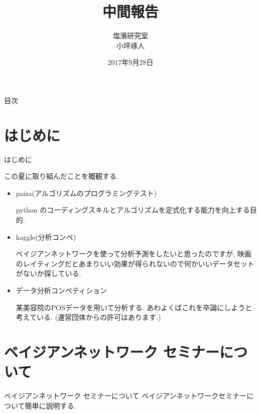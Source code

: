 \documentclass[dvipdfmx]{beamer}
\title[タイトル]{中間報告}
\author[発表者名]{塩濱研究室\\小坪琢人}
\institute[所属]{東京理科大学\ 工学部経営工学科4年\\学籍番号 4414036}
\date[日付]{2017年9月28日}
\begin{document}
\begin{frame}[plain]
\titlepage
\end{frame}
	
\begin{frame}{目次}
\tableofcontents
\end{frame}

\section{はじめに}
\begin{frame}{はじめに}

この夏に取り組んだことを概観する.

\begin{itemize}

\item paiza(アルゴリズムのプログラミングテスト)

python のコーディングスキルとアルゴリズムを定式化する能力を向上する目的.

\item kaggle(分析コンペ)

ベイジアンネットワークを使って分析予測をしたいと思ったのですが, 映画のレイティングだとあまりいい効果が得られないので何かいいデータセットがないか探している.

\item データ分析コンペティション

某美容院のPOSデータを用いて分析する. あわよくばこれを卒論にしようと考えている. (運営団体からの許可はあります.)

\end{itemize}
\end{frame}

\section{ベイジアンネットワーク セミナーについて}
\begin{frame}{ベイジアンネットワーク セミナーについて}
ベイジアンネットワークセミナーについて簡単に説明する.
\end{frame}
\end{document}
